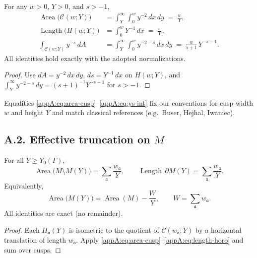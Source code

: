 \begin{lemma}
\label{appA:lem:ref-int}
For any $w>0$, $Y>0$, and $s>-1$,
\begin{align}
\operatorname{Area}\big(\mathcal{C}(w;Y)\big)
 &= \int_Y^\infty\!\!\int_0^{w} y^{-2}\,dx\,dy
  \;=\; \frac{w}{Y},
\label{appA:eq:area-cusp}\\[2mm]
\operatorname{Length}\big(H(w;Y)\big)
 &= \int_0^{w} Y^{-1}\,dx
  \;=\; \frac{w}{Y},
\label{appA:eq:length-horo}\\[2mm]
\int_{\mathcal{C}(w;Y)} y^{-s}\,dA
 &= \int_Y^\infty\!\!\int_0^w y^{-2-s}\,dx\,dy
  \;=\; \frac{w}{s+1}\,Y^{-s-1}.
\label{appA:eq:ys-int}
\end{align}
All identities hold exactly with the adopted normalizations.
\end{lemma}

\begin{proof}
Use $dA=y^{-2}\,dx\,dy$, $ds=Y^{-1}\,dx$ on $H(w;Y)$, and
$\int_Y^\infty y^{-2-s}\,dy=(s+1)^{-1}Y^{-s-1}$ for $s>-1$.
\end{proof}

\begin{remark}
\label{appA:rmk:normalization}
Equalities \eqref{appA:eq:area-cusp}–\eqref{appA:eq:ys-int} fix our conventions
for cusp width $w$ and height $Y$ and match classical references (e.g.\ Buser,
Hejhal, Iwaniec).
\end{remark}

\subsection*{A.2. Effective truncation on $M$}
\label{appA:subsec:truncation-on-M}

\begin{proposition}
\label{appA:prop:vol-defect}
For all $Y\ge Y_0(\Gamma)$,
\begin{equation}
\operatorname{Area}\!\big(M\setminus M(Y)\big)
= \sum_{\mathfrak{a}} \frac{w_{\mathfrak{a}}}{Y},
\qquad
\operatorname{Length}\,\partial M(Y)
= \sum_{\mathfrak{a}} \frac{w_{\mathfrak{a}}}{Y}.
\label{appA:eq:vol-defect}
\end{equation}
Equivalently,
\[
\operatorname{Area}\big(M(Y)\big)
= \operatorname{Area}(M) - \frac{W}{Y},
\qquad
W=\sum_{\mathfrak{a}} w_{\mathfrak{a}}.
\]
All identities are exact (no remainder).
\end{proposition}

\begin{proof}
Each $\Pi_{\mathfrak{a}}(Y)$ is isometric to the quotient of
$\mathcal{C}(w_{\mathfrak{a}};Y)$ by a horizontal translation of length
$w_{\mathfrak{a}}$. Apply \eqref{appA:eq:area-cusp}–\eqref{appA:eq:length-horo}
and sum over cusps.
\end{proof}

